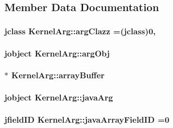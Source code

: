 \subsection{Member Data Documentation}
\hypertarget{class_kernel_arg_a1535ba5730bc5280a108e0347796386b}{
\subsubsection[{arg\-Clazz}]{\setlength{\rightskip}{0pt plus 5cm}jclass Kernel\-Arg\-::arg\-Clazz =(jclass)0\hspace{0.3cm}{\ttfamily [static]}, {\ttfamily [private]}}}\label{class_kernel_arg_a1535ba5730bc5280a108e0347796386b}
\hypertarget{class_kernel_arg_a6c682f2814e39eca2a5bd66a056e69b5}{
\subsubsection[{arg\-Obj}]{\setlength{\rightskip}{0pt plus 5cm}jobject Kernel\-Arg\-::arg\-Obj}}\label{class_kernel_arg_a6c682f2814e39eca2a5bd66a056e69b5}
\hypertarget{class_kernel_arg_aa4e252a62dc2f9c9eb1050313d966d02}{
\subsubsection[{array\-Buffer}]{$\ast$ Kernel\-Arg\-::array\-Buffer}}\label{class_kernel_arg_aa4e252a62dc2f9c9eb1050313d966d02}
\hypertarget{class_kernel_arg_a34bc41a663249aca5caecbce438ce6a2}{
\subsubsection[{java\-Arg}]{\setlength{\rightskip}{0pt plus 5cm}jobject Kernel\-Arg\-::java\-Arg}}\label{class_kernel_arg_a34bc41a663249aca5caecbce438ce6a2}
\hypertarget{class_kernel_arg_a6975716f608862b70a40fc562c0ce774}{
\subsubsection[{java\-Array\-Field\-I\-D}]{\setlength{\rightskip}{0pt plus 5cm}jfield\-I\-D Kernel\-Arg\-::java\-Array\-Field\-I\-D =0\hspace{0.3cm}{\ttfamily [static]}}}\label{class_kernel_arg_a6975716f608862b70a40fc562c0ce774}
